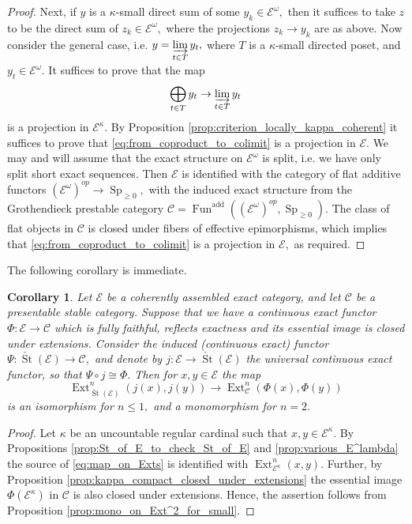 \documentclass[11pt,leqno]{amsart}
\newtheorem{cor}[theo]{Corollary}
\numberwithin{equation}{section}
\newcommand{\indlim}[1][]{\mathop{\varinjlim}\limits_{#1}}
\newcommand{\biggplus}[1][]{\mathop{\bigoplus}\limits_{#1}}
\newcommand{\St}{\operatorname{St}}
\newcommand{\cC}{{\mathcal C}}
\newcommand{\cE}{{\mathcal E}}
\newcommand{\Fun}{\operatorname{Fun}}
\newcommand{\Ext}{\operatorname{Ext}}
\newcommand{\Sp}{\operatorname{Sp}}
\newcommand{\add}{\operatorname{add}}
\begin{document}
\begin{proof}
Next, if $y$ is a $\kappa$-small direct sum of some $y_k\in\cE^{\omega},$ then it suffices to take $z$ to be the direct sum of $z_k\in\cE^{\omega},$ where the projections $z_k\to y_k$ are as above. Now consider the general case, i.e. $y=\indlim[t\in T]y_t,$ where $T$ is a $\kappa$-small directed poset, and $y_t\in\cE^{\omega}.$ It suffices to prove that the map
\begin{equation}\label{eq:from_coproduct_to_colimit}
\biggplus[t\in T]y_t\to \indlim[t\in T]y_t
\end{equation}
is a projection in $\cE^{\kappa}.$ By Proposition \ref{prop:criterion_locally_kappa_coherent} it suffices to prove that \eqref{eq:from_coproduct_to_colimit} is a projection in $\cE.$ We may and will assume that the exact structure on $\cE^{\omega}$ is split, i.e. we have only split short exact sequences. Then $\cE$ is identified with the category of flat additive functors $(\cE^{\omega})^{op}\to \Sp_{\geq 0},$ with the induced exact structure from the Grothendieck prestable 
category $\cC=\Fun^{\add}((\cE^{\omega})^{op},\Sp_{\geq 0}).$ The class of flat objects in $\cC$ is closed under fibers of effective epimorphisms, which implies that \eqref{eq:from_coproduct_to_colimit} is a projection in $\cE,$ as required.
\end{proof}

The following corollary is immediate.

\begin{cor}\label{cor:mono_for_Ext^2}
Let $\cE$ be a coherently assembled exact category, and let $\cC$ be a presentable stable category. Suppose that we have a continuous exact functor $\Phi:\cE\to\cC$ which is fully faithful, reflects exactness and its essential image is closed under extensions. Consider the induced (continuous exact) functor $\Psi:\check{\St}(\cE)\to\cC,$ and denote by $j:\cE\to\check{\St}(\cE)$ the universal continuous exact functor, so that $\Psi\circ j\cong\Phi.$ Then for $x,y\in\cE$ the map 
\begin{equation}\label{eq:map_on_Exts}
\Ext^n_{\check{\St}(\cE)}(j(x),j(y))\to\Ext^n_{\cC}(\Phi(x),\Phi(y))
\end{equation} is an isomorphism for $n\leq 1,$ and a monomorphism for $n=2.$  
\end{cor}

\begin{proof}
Let $\kappa$ be an uncountable regular cardinal such that $x,y\in\cE^{\kappa}.$ By Propositions \ref{prop:St_of_E_to_check_St_of_E} and \ref{prop:various_E^lambda} the source of \eqref{eq:map_on_Exts} is identified with $\Ext^n_{\cE^{\kappa}}(x,y).$ Further, by Proposition \ref{prop:kappa_compact_closed_under_extensions} the essential image $\Phi(\cE^{\kappa})$ in $\cC$ is also closed under extensions. Hence, the assertion follows from Proposition \ref{prop:mono_on_Ext^2_for_small}.
\end{proof}
\end{document}
